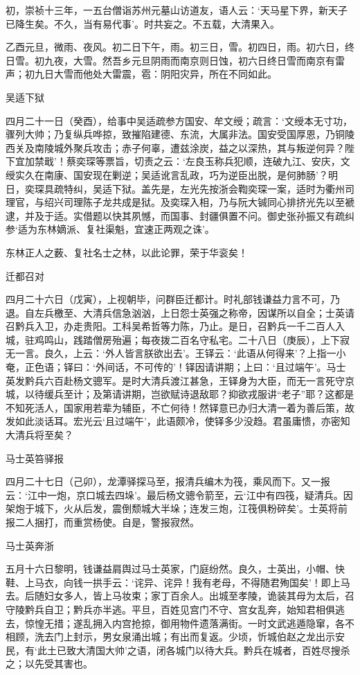 \documentclass[]{article}
\begin{document}
初，崇祯十三年，一五台僧诣苏州元墓山访道友，语人云：`天马星下界，新天子已降生矣。不久，当有易代事'。时共妄之。不五载，大清果入。

乙酉元旦，微雨、夜风。初二日下午，雨。初三日，雪。初四日，雨。初六日，终日雪。初九夜，大雪。然吾乡元旦阴雨而南京则日蚀，初六日终日雪而南京有雷声；初九日大雪而他处大雷震，雹：阴阳灾异，所在不同如此。

吴适下狱

四月二十一日（癸酉），给事中吴适疏参方国安、牟文绶；疏言：`文绶本无寸功，骤列大帅；乃复纵兵哗掠，致摧陷建德、东流，大属非法。国安受国厚恩，乃铜陵西关及南陵城外聚兵攻击；赤子何辜，遭兹涂炭，益之以深热，其与叛逆何异？陛下宜加禁戢'！蔡奕琛等票旨，切责之云：`左良玉称兵犯顺，连破九江、安庆，文绶实久在南康、国安现在剿逆；吴适讹言乱政，巧为逆臣出脱，是何肺肠'？明日，奕琛具疏特纠，吴适下狱。盖先是，左光先按浙会鞫奕琛一案，适时为衢州司理官，与绍兴司理陈子龙共成是狱。及奕琛入相，乃与阮大铖同心排挤光先以至褫逮，并及于适。实借题以快其夙憾，而国事、封疆俱置不问。御史张孙振又有疏纠参`适为东林嫡派、复社渠魁，宜速正两观之诛'。

东林正人之薮、复社名士之林，以此论罪，荣于华衮矣！

迁都召对

四月二十六日（戊寅），上视朝毕，问群臣迁都计。时礼部钱谦益力言不可，乃退。自左兵檄至、大清兵信急汹汹，上日怨士英强之称帝，因谋所以自全；士英请召黔兵入卫，办走贵阳。工科吴希哲等力陈，乃止。是日，召黔兵一千二百人入城，驻鸡鸣山，践踏僧房殆遍；每夜拨二百名守私宅。二十八日（庚辰），上下寂无一言。良久，上云：`外人皆言朕欲出去'。王铎云：`此语从何得来'？上指一小奄，正色语；铎曰：`外间话，不可传的'！铎因请讲期；上曰：`且过端午'。马士英发黔兵六百赴杨文骢军。是时大清兵渡江甚急，王铎身为大臣，而无一言死守京城，以待缓兵至计；及第请讲期，岂欲赋诗退敌耶？抑欲戎服讲``老子''耶？这都是不知死活人，国家用若辈为辅臣，不亡何待！然铎意已办归大清一着为善后策，故发如此淡话耳。宏光云`且过端午'，此语颇冷，使铎多少没趋。君虽庸愦，亦密知大清兵将至矣？

马士英笞驿报

四月二十七日（己卯），龙潭驿探马至，报清兵编木为筏，乘风而下。又一报云：`江中一炮，京口城去四垛'。最后杨文骢令箭至，云`江中有四筏，疑清兵。因架炮于城下，火从后发，震倒颓城大半垛；连发三炮，江筏俱粉碎矣'。士英将前报二人捆打，而重赏杨使。自是，警报寂然。

马士英奔浙

五月十六日黎明，钱谦益肩舆过马士英家，门庭纷然。良久，士英出，小帽、快鞋、上马衣，向钱一拱手云：`诧异、诧异！我有老母，不得随君殉国矣'！即上马去。后随妇女多人，皆上马妆束；家丁百余人。出城至孝陵，诡装其母为太后，召守陵黔兵自卫；黔兵亦半逃。平旦，百姓见宫门不守、宫女乱奔，始知君相俱逃去，惊惶无措；遂乱拥入内宫抢掠，御用物件遗落满街。一时文武逃遁隐窜，各不相顾，洗去门上封示，男女泉涌出城；有出而复返。少顷，忻城伯赵之龙出示安民，有`此土已致大清国大帅'之语，闭各城门以待大兵。黔兵在城者，百姓尽搜杀之；以先受其害也。
\end{document}
